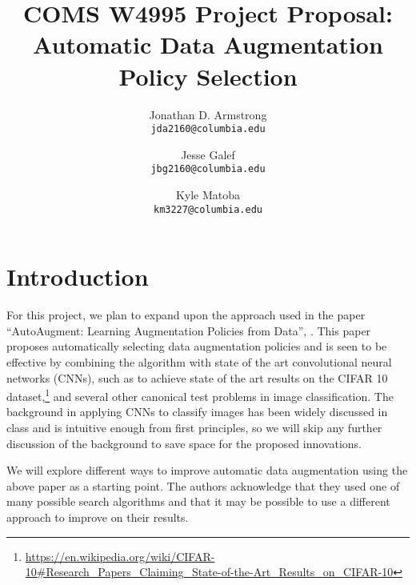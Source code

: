 \documentclass[10pt,twocolumn,letterpaper]{article}
\begin{document}
\title{COMS W4995 Project Proposal: Automatic Data Augmentation Policy Selection}

\author{Jonathan D. Armstrong\\
{\tt\small jda2160@columbia.edu}
\and
Jesse Galef\\
{\tt\small jbg2160@columbia.edu}
\and
Kyle Matoba\\
{\tt\small km3227@columbia.edu}
}

\maketitle


\section{Introduction}

For this project, we plan to expand upon the approach used in the paper ``AutoAugment: Learning Augmentation Policies from Data'', \cite{Cubuk2018}. This paper proposes automatically selecting data augmentation policies and is seen to be effective by combining the algorithm with state of the art convolutional neural networks (CNNs), such as \cite{Yamada2018} to achieve state of the art results on the CIFAR 10 dataset,\footnote{\url{https://en.wikipedia.org/wiki/CIFAR-10\#Research\_Papers\_Claiming\_State-of-the-Art\_Results\_on\_CIFAR-10}} and several other canonical test problems in image classification. The background in applying CNNs to classify images has been widely discussed in class and is intuitive enough from first principles, so we will skip any further discussion of the background to save space for the proposed innovations.

We will explore different ways to improve automatic data augmentation using the above paper as a starting point. The authors acknowledge that they used one of many possible search algorithms and that it may be possible to use a different approach to improve on their results. 
\end{document}
